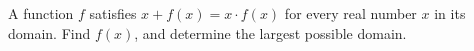 A function $f$ satisfies $x+f(x)=x\cdot f(x)$ for every real number $x$ in its domain. Find $f(x)$, and determine the largest possible domain.
